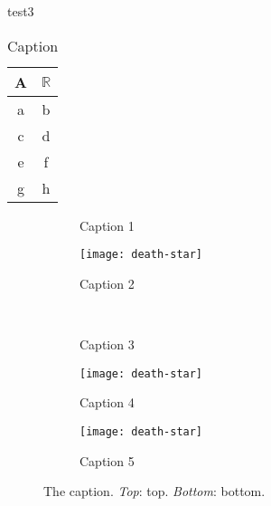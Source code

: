 \documentclass[xcolor=dvipsnames]{beamer}
\begin{document}
  \begin{frame}{test3}
    \begin{table}[h]
      \centering
      \caption{Caption}
      \label{tab:label}
      \begin{tabular}{cc}
        \toprule
        A & $\mathbb{R}$ \\
        \midrule
        a & b \\
        c & d \\
        \midrule
        e & f \\
        g & h \\
        \bottomrule
      \end{tabular}
    \end{table}
  \end{frame}

  \begin{frame}
    \begin{figure}[htb]
      \centering
      \begin{subfigure}[b]{.250\textwidth}
        \caption{Caption 1}  %
        \label{fig:1}
      \end{subfigure}
      \qquad
      \qquad
      \begin{subfigure}[b]{.250\textwidth}
        \texttt{[image: death-star]}
        \caption{Caption 2}
        \label{fig:2}
      \end{subfigure}
      \\
      \begin{subfigure}[b]{.175\textwidth}
        \caption{Caption 3}
        \label{fig:3}
      \end{subfigure}
      \qquad
      \begin{subfigure}[b]{.175\textwidth}
        \texttt{[image: death-star]}
        \caption{Caption 4}
        \label{fig:4}
      \end{subfigure}
      \qquad
      \begin{subfigure}[b]{.175\textwidth}
        \texttt{[image: death-star]}
        \caption{Caption 5}
        \label{fig:5}
      \end{subfigure}
      \caption{The caption. \emph{Top}: top. \emph{Bottom}: bottom.}
      \label{fig:subfigures}
    \end{figure}
  \end{frame}
\end{document}
